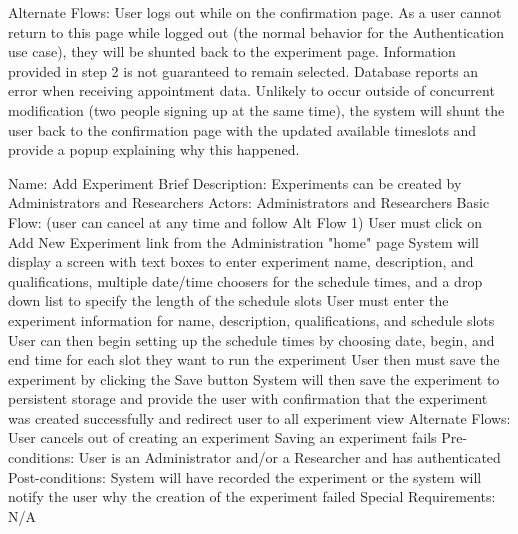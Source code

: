 \begin{outline}[enumerate]
\2 Alternate Flows:
\3 User logs out while on the confirmation page.
\4 As a user cannot return to this page while logged out (the normal behavior for the Authentication use case), they will be shunted back to the experiment page.  Information provided in step 2 is not guaranteed to remain selected.
\3 Database reports an error when receiving appointment data.
\4 Unlikely to occur outside of concurrent modification (two people signing up at the same time), the system will shunt the user back to the confirmation page with the updated available timeslots and provide a popup explaining why this happened.


\1 Name: Add Experiment
\2 Brief Description: Experiments can be created by Administrators and Researchers
\2 Actors: Administrators and Researchers
\2 Basic Flow: (user can cancel at any time and follow Alt Flow 1)
\3 User must click on Add New Experiment link from the Administration "home" page
\3 System will display a screen with text boxes to enter experiment name, description,  and qualifications, multiple date/time choosers for the schedule times, and a drop down list to specify the length of the schedule slots
\3 User must enter the experiment information for name, description, qualifications, and schedule slots
\3 User can then begin setting up the schedule times by choosing date, begin, and end time for each slot they want to run the experiment
\3 User then must save the experiment by clicking the Save button
\3 System will then save the experiment to persistent storage and provide the user with confirmation that the experiment was created successfully and redirect user to all experiment view
\2 Alternate Flows:
\3 User cancels out of creating an experiment
\3 Saving an experiment fails
\2 Pre-conditions:
\3 User is an Administrator and/or a Researcher and has authenticated
\2 Post-conditions:
\3 System will have recorded the experiment or the system will notify the user why the creation of the experiment failed
\2 Special Requirements:
\3 N/A


\end{outline}
